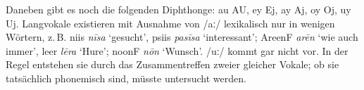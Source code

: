 \documentclass[12pt,paper=a4]{scrartcl}
\newcommand{\ayr}[1]{{\Tagati #1}}
\newcommand{\xayr}[3]{{\Tagati #1} \emph{#2} `#3'}
\begin{document}
Daneben gibt es noch die folgenden Diphthonge: au \ayr{AU}, ey \ayr{Ej}, ay 
\ayr{Aj}, oy \ayr{Oj}, uy \ayr{Uj}. Langvokale existieren mit Ausnahme von /aː/ 
lexikalisch nur in wenigen Wörtern, z.\,B. \xayr{niis}{nīsa}{gesucht}, 
\xayr{psiis}{pasīsa}{interessant}; \xayr{AreenF}{arēn}{wie auch immer}, 
\xayr{leer}{lēra}{Hure}; \xayr{noonF}{nōn}{Wunsch}. /uː/ kommt gar nicht vor. 
In der Regel entstehen sie durch das Zusammentreffen zweier gleicher Vokale; ob 
sie tatsächlich phonemisch sind, müsste untersucht werden.
\end{document}
